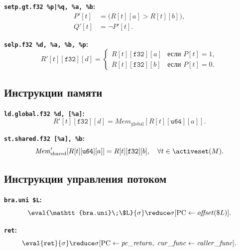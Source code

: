 \textbf{\texttt{setp.gt.f32 \%p|\%q, \%a, \%b}:}
\begin{align*}
  P'[t] &= \bigl(R[t][a] > R[t][b]\bigr), \\
  Q'[t] &= \neg P'[t].
\end{align*}

\textbf{\texttt{selp.f32 \%d, \%a, \%b, \%p}:}
\[
  R'[t][\mathtt{f32}][d] =
  \begin{cases}
    R[t][\mathtt{f32}][a] & \text{если } P[t] = 1, \\
    R[t][\mathtt{f32}][b] & \text{если } P[t] = 0.
  \end{cases}
\]

\subsection*{Инструкции памяти}

\textbf{\texttt{ld.global.f32 \%d, [\%a]}:}
\[
  R'[t][\mathtt{f32}][d] = \mathit{Mem}_{\mathrm{global}}[R[t][\mathtt{u64}][a]].
\]

\textbf{\texttt{st.shared.f32 [\%a], \%b}:}
\[
  \mathit{Mem}_{\mathrm{shared}}'[R[t][\mathtt{u64}][a]] = R[t][\mathtt{f32}][b],
  \quad \forall t \in \activeset(M).
\]

\subsection*{Инструкции управления потоком}

\textbf{\texttt{bra.uni \$L}:}
\[
  \eval{\mathtt{bra.uni}\;\$L}{\sigma}
  \reduce \sigma[\mathrm{PC} \leftarrow \mathit{offset}(\$L)].
\]

\textbf{\texttt{ret}:}
\[
  \eval{\mathtt{ret}}{\sigma}
  \reduce \sigma[\mathrm{PC} \leftarrow \mathit{pc\_return},\;
                  \mathit{cur\_func} \leftarrow \mathit{caller\_func}].
\]
